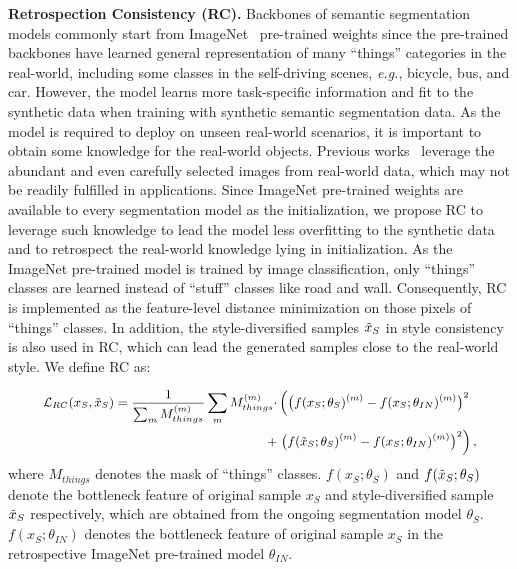 \documentclass[runningheads]{llncs}
\def\eg{\emph{e.g.}} \def\Eg{\emph{E.g.}}
\begin{document}
\noindent\textbf{Retrospection Consistency (RC).}
Backbones of semantic segmentation models commonly start from ImageNet~\cite{imagenet} pre-trained weights since the pre-trained backbones have learned general representation of many ``things'' categories in the real-world, including some classes in the self-driving scenes, \eg, bicycle, bus, and car. However, the model learns more task-specific information and fit to the synthetic data when training with synthetic semantic segmentation data.
As the model is required to deploy on unseen real-world scenarios, it is important to obtain some knowledge for the real-world objects.
Previous works~\cite{DRPC,FSDR} leverage the abundant and even carefully selected images from real-world data, which may not be readily fulfilled in applications. 
Since ImageNet pre-trained weights are available to every segmentation model as the initialization, we propose RC to leverage such knowledge to lead the model less overfitting to the synthetic data and to retrospect the real-world knowledge lying in initialization.
As the ImageNet pre-trained model is trained by image classification, only ``things'' classes are learned instead of ``stuff'' classes like road and wall. Consequently, RC is implemented as the feature-level distance minimization on those pixels of ``things'' classes.
In addition, the style-diversified samples $\Tilde{x}_S$ in style consistency is also used in RC, which can lead the generated samples close to the real-world style.
We define RC as:

\begin{equation}
\small
\begin{aligned}
    \mathcal{L}_{RC}(x_S, \Tilde{x}_S) = \frac{1}{\sum_m M_{things}^{(m)}} \sum_m M_{things}^{(m)} \cdot & \left( \left( f(x_S;\theta_S)^{(m)} - f(x_S;\theta_{IN})^{(m)} \right)^2 \right. \\ 
    +& \left. \left( f(\Tilde{x}_S;\theta_S)^{(m)}-f(x_S;\theta_{IN})^{(m)} \right)^2 \right),
\end{aligned}
\end{equation}
where $M_{things}$ denotes the mask of ``things'' classes. $f(x_S;\theta_S)$ and $f(\Tilde{x}_S;\theta_S)$ denote the bottleneck feature of original sample $x_S$ and style-diversified sample $\Tilde{x}_S$ respectively, which are obtained from the ongoing segmentation model $\theta_S$. $f(x_S;\theta_{IN})$ denotes the bottleneck feature of original sample $x_S$ in the retrospective ImageNet pre-trained model $\theta_{IN}$. 
\end{document}
